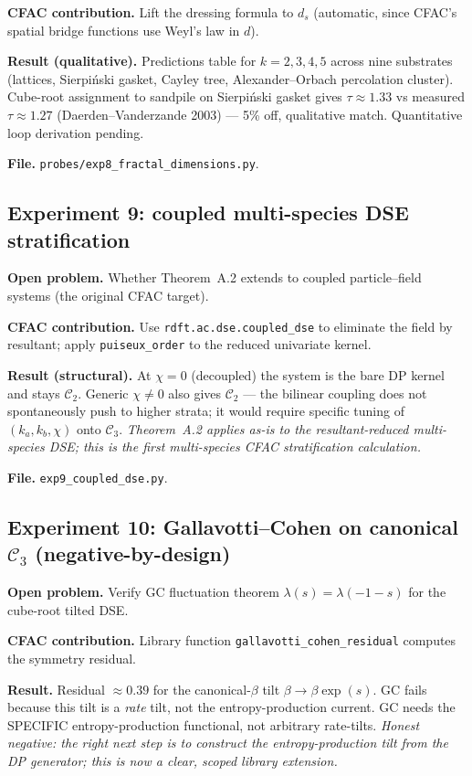 \documentclass[11pt,a4paper]{article}
\theoremstyle{plain}
\newcommand{\Ck}{\mathcal{C}}
\begin{document}
\textbf{CFAC contribution.}  Lift the dressing formula to $d_{s}$
(automatic, since CFAC's spatial bridge functions use Weyl's law in $d$).

\textbf{Result (qualitative).}  Predictions table for $k=2,3,4,5$ across
nine substrates (lattices, Sierpi\'nski gasket, Cayley tree, Alexander--Orbach
percolation cluster).  Cube-root assignment to sandpile on Sierpi\'nski
gasket gives $\tau\approx 1.33$ vs measured $\tau\approx 1.27$
(Daerden--Vanderzande 2003) --- 5\% off, qualitative match.  Quantitative
loop derivation pending.

\textbf{File.}  \texttt{probes/exp8\_fractal\_dimensions.py}.

\subsection*{Experiment 9: coupled multi-species DSE stratification}

\textbf{Open problem.}  Whether Theorem~A.2 extends to coupled
particle--field systems (the original CFAC target).

\textbf{CFAC contribution.}  Use \texttt{rdft.ac.dse.coupled\_dse} to
eliminate the field by resultant; apply \texttt{puiseux\_order} to the
reduced univariate kernel.

\textbf{Result (structural).}  At $\chi=0$ (decoupled) the system is the
bare DP kernel and stays $\Ck_{2}$.  Generic $\chi\neq 0$ also gives
$\Ck_{2}$ --- the bilinear coupling does not spontaneously push to higher
strata; it would require specific tuning of $(k_{a}, k_{b}, \chi)$ onto
$\Ck_{3}$.  \emph{Theorem~A.2 applies as-is to the resultant-reduced
multi-species DSE; this is the first multi-species CFAC stratification
calculation.}

\textbf{File.}  \texttt{exp9\_coupled\_dse.py}.

\subsection*{Experiment 10: Gallavotti--Cohen on canonical $\Ck_{3}$
(negative-by-design)}

\textbf{Open problem.}  Verify GC fluctuation theorem
$\lambda(s) = \lambda(-1-s)$ for the cube-root tilted DSE.

\textbf{CFAC contribution.}  Library function
\texttt{gallavotti\_cohen\_residual} computes the symmetry residual.

\textbf{Result.}  Residual $\approx 0.39$ for the canonical-$\beta$ tilt
$\beta\to\beta\exp(s)$.  GC fails because this tilt is a \emph{rate} tilt,
not the entropy-production current.  GC needs the SPECIFIC entropy-production
functional, not arbitrary rate-tilts.  \emph{Honest negative: the right
next step is to construct the entropy-production tilt from the DP generator;
this is now a clear, scoped library extension.}
\end{document}
